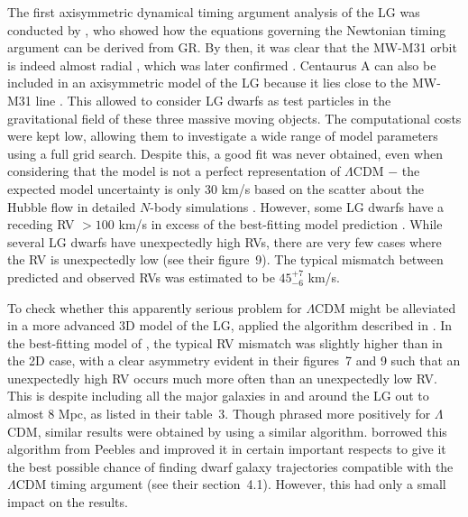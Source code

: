 \documentclass[fleqn,usenatbib,useAMS]{mnras} %
\begin{document}
The first axisymmetric dynamical timing argument analysis of the LG was conducted by \citet{Banik_Zhao_2016}, who showed how the equations governing the Newtonian timing argument can be derived from GR. By then, it was clear that the MW-M31 orbit is indeed almost radial \citep{Van_der_Marel_2012}, which was later confirmed \citep{Van_der_Marel_2019, Salomon_2021}. Centaurus A can also be included in an axisymmetric model of the LG because it lies close to the MW-M31 line \citep{Ma_1998}. This allowed \citet{Banik_Zhao_2016} to consider LG dwarfs as test particles in the gravitational field of these three massive moving objects. The computational costs were kept low, allowing them to investigate a wide range of model parameters using a full grid search. Despite this, a good fit was never obtained, even when considering that the model is not a perfect representation of $\Lambda$CDM $-$ the expected model uncertainty is only 30 km/s based on the scatter about the Hubble flow in detailed $N$-body simulations \citep{Aragon_Calvo_2011}. However, some LG dwarfs have a receding RV $>100$ km/s in excess of the best-fitting model prediction \citep{Banik_Zhao_2016}. While several LG dwarfs have unexpectedly high RVs, there are very few cases where the RV is unexpectedly low (see their figure~9). The typical mismatch between predicted and observed RVs was estimated to be $45^{+7}_{-6}$ km/s.

To check whether this apparently serious problem for $\Lambda$CDM might be alleviated in a more advanced 3D model of the LG, \citet{Banik_Zhao_2017} applied the algorithm described in \citet{Shaya_2011}. In the best-fitting model of \citet{Banik_Zhao_2017}, the typical RV mismatch was slightly higher than in the 2D case, with a clear asymmetry evident in their figures~7 and 9 such that an unexpectedly high RV occurs much more often than an unexpectedly low RV. This is despite including all the major galaxies in and around the LG out to almost 8 Mpc, as listed in their table~3. Though phrased more positively for $\Lambda$CDM, similar results were obtained by \citet{Peebles_2017} using a similar algorithm. \citet{Banik_2018_anisotropy} borrowed this algorithm from Peebles and improved it in certain important respects to give it the best possible chance of finding dwarf galaxy trajectories compatible with the $\Lambda$CDM timing argument (see their section~4.1). However, this had only a small impact on the results.
\end{document}
